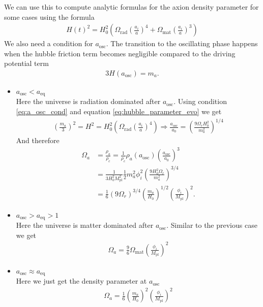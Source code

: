 \documentclass[a4paper]{article}
\begin{document}
We can use this to compute analytic formulas for the axion density parameter for some cases \cite[Chap 4.3.1, Page 28]{MarshAxionCosmo} using the formula
\begin{align}
    \label{eq:hubble_parameter_evo}
    H(t)^2 = H_0^2 \left(
        \Omega_\mathrm{rad} \left( \frac{a_i}{a} \right)^4 +
        \Omega_\mathrm{mat} \left( \frac{a_i}{a} \right)^3
    \right)
\end{align}
We also need a condition for $a_\mathrm{osc}$. The transition to the oscillating phase happens when the
hubble friction term becomes negligible compared to the driving potential term
\begin{align}
    \label{eq:a_osc_cond}
    3 H(a_\mathrm{osc}) = m_a.
\end{align}
\begin{itemize}
    \item $a_\mathrm{osc} < a_\mathrm{eq}$ \\
    Here the universe is radiation dominated after $a_\mathrm{osc}$.
    Using condition \ref{eq:a_osc_cond} and equation \ref{eq:hubble_parameter_evo} we get
    \begin{align*}
        \left(\frac{m_a}{3}\right)^2 = H^2 = H_0^2 \left(
        \Omega_\mathrm{rad} \left( \frac{a_i}{a} \right)^4
    \right) \Rightarrow \frac{a_\mathrm{osc}}{a_0} = \left( \frac{9 \Omega_r H_0^2}{m_a^2} \right)^{1/4}
    \end{align*}
    And therefore
    \begin{align*}
        \Omega_a &= \frac{\rho_a}{\rho_c} = \frac{1}{\rho_c} \rho_a(a_\mathrm{osc}) \left( \frac{a_\mathrm{osc}}{a_0} \right)^3 \\
                 &= \frac{1}{3 H_0^2 M_\mathrm{pl}^2} \frac{1}{2} m_a^2 \phi_i^2 \left( \frac{9 H_0^2 \Omega_r}{m_a^2} \right)^{3/4} \\
                 &= \frac{1}{6} \left( 9 \Omega_r \right)^{3/4} \left( \frac{m_a}{H_0} \right)^{1/2} \left( \frac{\phi_i}{M_\mathrm{pl}} \right)^2.
    \end{align*}
    \item $a_\mathrm{osc} > a_\mathrm{eq} > 1$ \\
    Here the universe is matter dominated after $a_\mathrm{osc}$.
    Similar to the previous case we get
    \begin{align*}
        \Omega_a = \frac{9}{6} \Omega_\mathrm{mat} \left( \frac{\phi_i}{M_\mathrm{pl}} \right)^2
    \end{align*}
    \item $a_\mathrm{osc} \approx a_\mathrm{eq}$ \\
    Here we just get the density parameter at $a_\mathrm{osc}$
    \begin{align*}
        \Omega_a = \frac{1}{6} \left( \frac{m_a}{H_0} \right)^2 \left( \frac{\phi_i}{M_\mathrm{pl}} \right)^2
    \end{align*}
\end{itemize}
\end{document}
